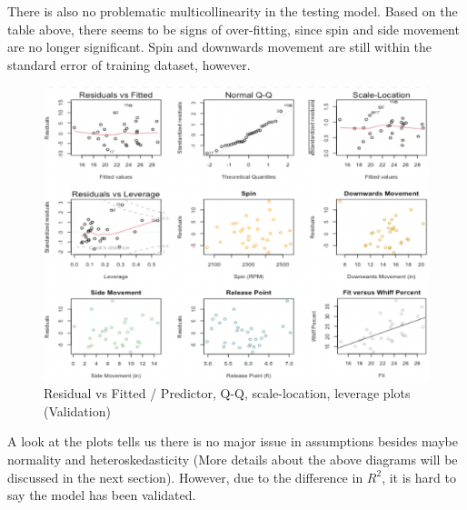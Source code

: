 \documentclass[12pt]{article}
\begin{document}
There is also no problematic multicollinearity in the testing model. Based on the table above, there seems to be signs of over-fitting, since spin and side movement are no longer significant. Spin and downwards movement are still within the standard error of training dataset, however. 

\begin{figure}[h]
    \begin{centering}
        \includegraphics[scale = 0.33]{pics/val assumptions.png}
    \caption{Residual vs Fitted / Predictor, Q-Q, scale-location, leverage plots (Validation)}
    \end{centering}
\end{figure}

A look at the plots tells us there is no major issue in assumptions besides maybe normality and heteroskedasticity (More details about the above diagrams will be discussed in the next section). However, due to the difference in $R^2$, it is hard to say the model has been validated. 



\end{document}
